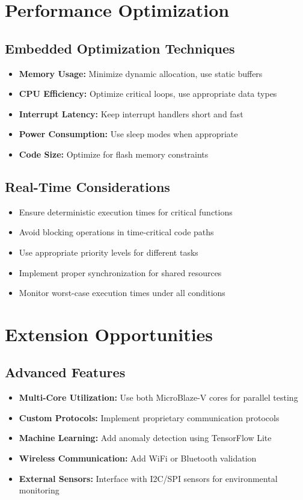 \documentclass[11pt,a4paper]{article}
\begin{document}
\section{Performance Optimization}

\subsection{Embedded Optimization Techniques}
\begin{itemize}
    \item \textbf{Memory Usage:} Minimize dynamic allocation, use static buffers
    \item \textbf{CPU Efficiency:} Optimize critical loops, use appropriate data types
    \item \textbf{Interrupt Latency:} Keep interrupt handlers short and fast
    \item \textbf{Power Consumption:} Use sleep modes when appropriate
    \item \textbf{Code Size:} Optimize for flash memory constraints
\end{itemize}

\subsection{Real-Time Considerations}
\begin{itemize}
    \item Ensure deterministic execution times for critical functions
    \item Avoid blocking operations in time-critical code paths
    \item Use appropriate priority levels for different tasks
    \item Implement proper synchronization for shared resources
    \item Monitor worst-case execution times under all conditions
\end{itemize}

\section{Extension Opportunities}

\subsection{Advanced Features}
\begin{itemize}
    \item \textbf{Multi-Core Utilization:} Use both MicroBlaze-V cores for parallel testing
    \item \textbf{Custom Protocols:} Implement proprietary communication protocols
    \item \textbf{Machine Learning:} Add anomaly detection using TensorFlow Lite
    \item \textbf{Wireless Communication:} Add WiFi or Bluetooth validation
    \item \textbf{External Sensors:} Interface with I2C/SPI sensors for environmental monitoring
\end{itemize}
\end{document}
